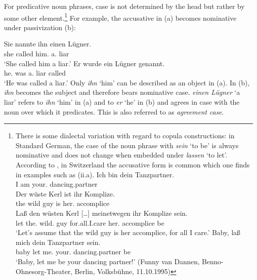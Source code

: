 For predicative\label{page-Kasuskongruenz} noun phrases, case is not determined by the head but rather by some other element.\footnote{%
	There is some dialectal variation with regard to copula constructions: in Standard German, the case of the noun phrase with \emph{sein} `to be'
	is always nominative and does not change when embedded under \emph{lassen} `to let'. According to \citet*[{\S}\,1259]{Duden95-Authors}, in Switzerland the
	accusative form is common which one finds in examples such as (ii.a).
	\eal
\ex 
\gll Ich bin dein Tanzpartner.\\
     I am your.\nom{} dancing.partner\\
\ex 
\gll Der wüste Kerl ist ihr Komplize.\\
     the wild  guy  is  her.\nom{} accomplice\\
\ex 
\gll Laß den wüsten Kerl [\ldots] meinetwegen ihr Komplize sein.\\
     let the.\acc{} wild.\acc{} guy {} for.all.I.care her.\nom{} accomplice be\\
\glt `Let's assume that the wild guy is her accomplice, for all I care.'  \citep*[{\S}\,6925]{Duden66-Authors}
\ex 
\gll Baby, laß mich dein Tanzpartner sein.\\
     baby let me.\acc{} your.\nom{} dancing.partner be\\
\glt `Baby, let me be your dancing partner!'  (Funny van Dannen, Benno-Ohnesorg-Theater, Berlin, Volksbühne, 11.10.1995)
\zl

        \eal
        \zllast
}
For example, the accusative in (a) becomes nominative under passivization (b):

\eal
\ex 
\gll Sie nannte ihn einen Lügner.\\
	 she called him.\acc{} a.\acc{} liar\\
\glt `She called him a liar.'
\ex 
\gll Er wurde ein Lügner genannt.\\
	 he.\nom{} was a.\nom{} liar called\\
\glt `He was called a liar.'
\zl
Only \emph{ihn} `him' can be described as an object in (a). In (b), \emph{ihn} becomes the subject and therefore 
bears nominative case. \emph{einen Lügner} `a liar' refers to \emph{ihn} `him' in (a) and to \emph{er}
`he' in (b) and agrees in case with the noun over which it predicates.
This is also referred to as \emph{agreement case}.

